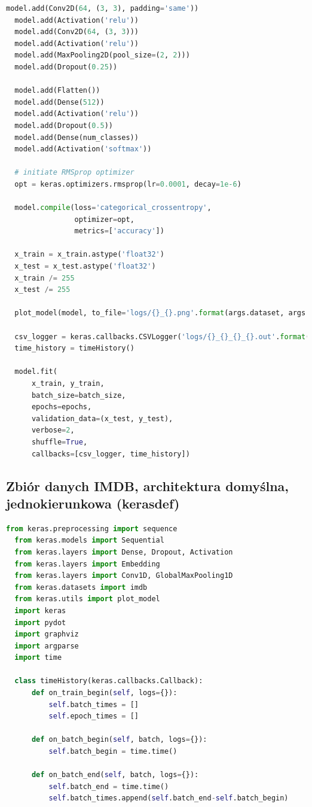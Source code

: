 \documentclass[12pt,a4paper,twoside]{article}
\begin{document}
\begin{appendices}
\begin{lstlisting}[language=python]
  model.add(Conv2D(64, (3, 3), padding='same'))
  model.add(Activation('relu'))
  model.add(Conv2D(64, (3, 3)))
  model.add(Activation('relu'))
  model.add(MaxPooling2D(pool_size=(2, 2)))
  model.add(Dropout(0.25))

  model.add(Flatten())
  model.add(Dense(512))
  model.add(Activation('relu'))
  model.add(Dropout(0.5))
  model.add(Dense(num_classes))
  model.add(Activation('softmax'))

  # initiate RMSprop optimizer
  opt = keras.optimizers.rmsprop(lr=0.0001, decay=1e-6)

  model.compile(loss='categorical_crossentropy',
                optimizer=opt,
                metrics=['accuracy'])

  x_train = x_train.astype('float32')
  x_test = x_test.astype('float32')
  x_train /= 255
  x_test /= 255

  plot_model(model, to_file='logs/{}_{}.png'.format(args.dataset, args.architecture))

  csv_logger = keras.callbacks.CSVLogger('logs/{}_{}_{}_{}.out'.format(args.run_date, args.dataset, args.architecture, args.instance_type))
  time_history = timeHistory()

  model.fit(
      x_train, y_train,
      batch_size=batch_size,
      epochs=epochs,
      validation_data=(x_test, y_test),
      verbose=2,
      shuffle=True,
      callbacks=[csv_logger, time_history])
\end{lstlisting}
\clearpage
\subsection{Zbiór danych IMDB, architektura domyślna, jednokierunkowa (kerasdef)}
\begin{lstlisting}[language=python]
  from keras.preprocessing import sequence
  from keras.models import Sequential
  from keras.layers import Dense, Dropout, Activation
  from keras.layers import Embedding
  from keras.layers import Conv1D, GlobalMaxPooling1D
  from keras.datasets import imdb
  from keras.utils import plot_model
  import keras
  import pydot
  import graphviz
  import argparse
  import time

  class timeHistory(keras.callbacks.Callback):
      def on_train_begin(self, logs={}):
          self.batch_times = []
          self.epoch_times = []

      def on_batch_begin(self, batch, logs={}):
          self.batch_begin = time.time()

      def on_batch_end(self, batch, logs={}):
          self.batch_end = time.time()
          self.batch_times.append(self.batch_end-self.batch_begin)


\end{lstlisting}
\end{appendices}
\end{document}
